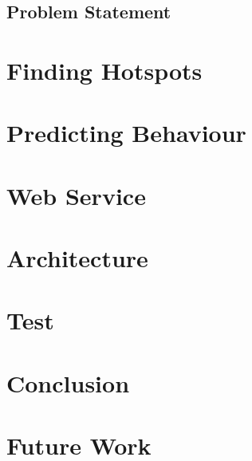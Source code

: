 \section{Problem Statement}\label{problem_statement}

		

\chapter{Finding Hotspots}





\chapter{Predicting Behaviour}





\chapter{Web Service}\label{chap:webservice}




\chapter{Architecture}




\chapter{Test}\label{chap:test}



\chapter{Conclusion}


\chapter{Future Work}


\appendix





